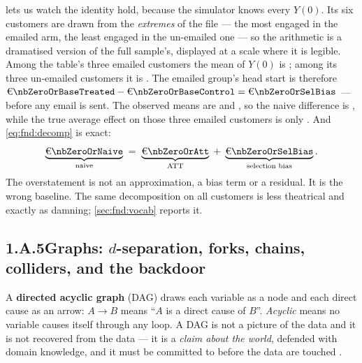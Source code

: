  lets us watch the identity hold, because the simulator knows every $Y(0)$.
Its six customers are drawn from the \emph{extremes} of the file --- the most engaged in the
emailed arm, the least engaged in the un-emailed one --- so the arithmetic is a dramatised version
of the full sample's, displayed at a scale where it is legible. Among the table's three emailed
customers the mean of $Y(0)$ is \eur{\nbZeroOrBaseTreated}; among its three un-emailed customers
it is \eur{\nbZeroOrBaseControl}. The emailed group's head start is therefore
$\eur{\nbZeroOrBaseTreated} - \eur{\nbZeroOrBaseControl} = \eur{\nbZeroOrSelBias}$ --- before any
email is sent. The observed means are \eur{\nbZeroOrTreatedMean} and \eur{\nbZeroOrControlMean}, so
the naive difference is \eur{\nbZeroOrNaive}, while the true average effect on those three emailed
customers is only \eur{\nbZeroOrAtt}. And \cref{eq:fnd:decomp} is exact:
%
\[
  \underbrace{\eur{\nbZeroOrNaive}}_{\text{naive}}
  \;=\; \underbrace{\eur{\nbZeroOrAtt}}_{\text{ATT}}
  \;+\; \underbrace{\eur{\nbZeroOrSelBias}}_{\text{selection bias}} .
\]
%
The overstatement is not an approximation, a bias term or a residual. It is the wrong baseline.
The same decomposition on all \nbZeroNCustomers{} customers is less theatrical and exactly as
damning; \cref{sec:fnd:vocab} reports it.

\subsection*{1.A.5\quad Graphs: $d$-separation, forks, chains, colliders, and the backdoor}

A \textbf{directed acyclic graph} (DAG) draws each variable as a node and each direct cause as an
arrow: $A \rightarrow B$ means ``$A$ is a direct cause of $B$''. \emph{Acyclic} means no variable
causes itself through any loop. A DAG is not a picture of the data and it is not recovered from the
data --- it is a \emph{claim about the world}, defended with domain knowledge, and it must be
committed to before the data are touched \citep{greenland1999}.

